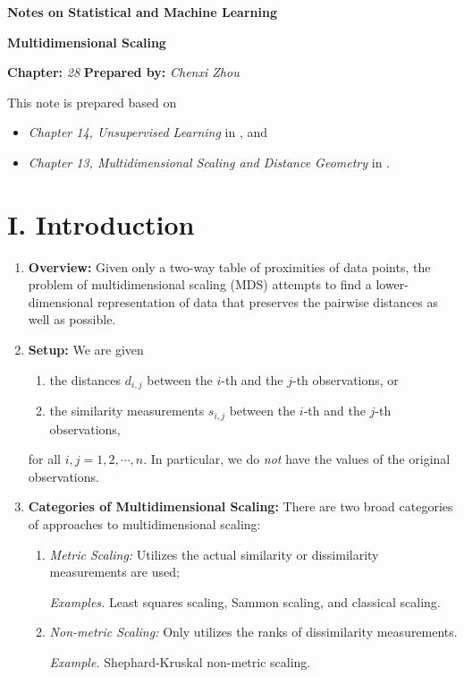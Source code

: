 \documentclass[12pt]{article}
\newcommand{\titlebox}[4]{
\begin{tcolorbox}[colback = blue!5!white!95, colframe = blue!70!black
]
  \noindent \textbf{ #1 } \hfill \textit{#2} 
  \begin{center}
  	 \LARGE{\textbf{#3}}
  \end{center}
\textbf{Chapter:} \textit{#4} \hfill \textbf{Prepared by:} \textit{Chenxi Zhou}
\end{tcolorbox}
}
\begin{document}
\titlebox{Notes on Statistical and Machine Learning}{}{Multidimensional Scaling}{28}
\thispagestyle{plain}

\vspace{10pt}

This note is prepared based on 
\begin{itemize}
	\item \textit{Chapter 14, Unsupervised Learning} in \textcite{Friedman2001-np}, and 
	\item \textit{Chapter 13, Multidimensional Scaling and Distance Geometry} in \textcite{Izenman2009-jk}. 
\end{itemize}


\section*{I. Introduction}

\begin{enumerate}[label=\textbf{\arabic*.}]

	\item \textbf{Overview:} Given only a two-way table of proximities of data points, the problem of multidimensional scaling (MDS) attempts to find a lower-dimensional representation of data that preserves the pairwise distances as well as possible. 
	
	\item \textbf{Setup:} We are given 
	\begin{enumerate}
		\item the distances $d_{i,j}$ between the $i$-th and the $j$-th observations, or 
		\item the similarity measurements $s_{i,j}$ between the $i$-th and the $j$-th observations, 
	\end{enumerate}
	for all $i, j = 1, 2, \cdots, n$. In particular, we do \emph{not} have the values of the original observations. 
	
	\item \textbf{Categories of Multidimensional Scaling:} There are two broad categories of approaches to multidimensional scaling: 
	\begin{enumerate}
		\item \textit{Metric Scaling:} Utilizes the actual similarity or dissimilarity measurements are used; 
		
		\textit{Examples.} Least squares scaling, Sammon scaling, and classical scaling. 
		
		\item \textit{Non-metric Scaling:} Only utilizes the ranks of dissimilarity measurements. 
		
		\textit{Example.} Shephard-Kruskal non-metric scaling. 
	\end{enumerate}

\end{enumerate}
\end{document}
